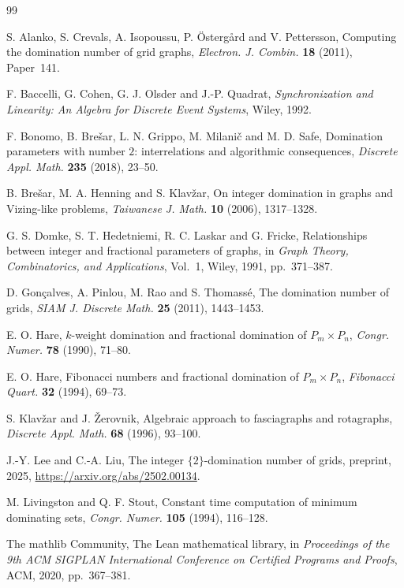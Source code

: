 \documentclass[12pt]{article}
\theoremstyle{plain}
\theoremstyle{remark}
\begin{document}
\begin{thebibliography}{99}

S. Alanko, S. Crevals, A. Isopoussu, P. \"Osterg{\aa}rd and V. Pettersson, Computing the
domination number of grid graphs, \emph{Electron. J. Combin.} \textbf{18} (2011), Paper~141.

F. Baccelli, G. Cohen, G. J. Olsder and J.-P. Quadrat, \emph{Synchronization and Linearity: An
Algebra for Discrete Event Systems}, Wiley, 1992.

F. Bonomo, B. Bre\v{s}ar, L. N. Grippo, M. Milani\v{c} and M. D. Safe, Domination parameters
with number $2$: interrelations and algorithmic consequences, \emph{Discrete Appl. Math.}
\textbf{235} (2018), 23--50.

B. Bre\v{s}ar, M. A. Henning and S. Klav\v{z}ar, On integer domination in graphs and
Vizing-like problems, \emph{Taiwanese J. Math.} \textbf{10} (2006), 1317--1328.

G. S. Domke, S. T. Hedetniemi, R. C. Laskar and G. Fricke, Relationships between integer and
fractional parameters of graphs, in \emph{Graph Theory, Combinatorics, and Applications},
Vol.~1, Wiley, 1991, pp.~371--387.

D. Gon\c{c}alves, A. Pinlou, M. Rao and S. Thomass\'e, The domination number of grids,
\emph{SIAM J. Discrete Math.} \textbf{25} (2011), 1443--1453.

E. O. Hare, $k$-weight domination and fractional domination of $P_m\times P_n$, \emph{Congr.
Numer.} \textbf{78} (1990), 71--80.

E. O. Hare, Fibonacci numbers and fractional domination of $P_m\times P_n$, \emph{Fibonacci
Quart.} \textbf{32} (1994), 69--73.

S. Klav\v{z}ar and J. \v{Z}erovnik, Algebraic approach to fasciagraphs and rotagraphs,
\emph{Discrete Appl. Math.} \textbf{68} (1996), 93--100.

J.-Y. Lee and C.-A. Liu, The integer $\{2\}$-domination number of grids, preprint, 2025,
\url{https://arxiv.org/abs/2502.00134}.

M. Livingston and Q. F. Stout, Constant time computation of minimum dominating sets,
\emph{Congr. Numer.} \textbf{105} (1994), 116--128.

The mathlib Community, The Lean mathematical library, in \emph{Proceedings of the 9th ACM
SIGPLAN International Conference on Certified Programs and Proofs}, ACM, 2020, pp.~367--381.


\end{thebibliography}
\end{document}
